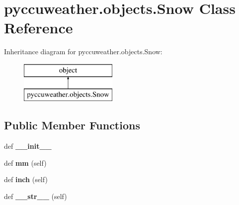 \hypertarget{classpyccuweather_1_1objects_1_1_snow}{}\section{pyccuweather.\+objects.\+Snow Class Reference}
\label{classpyccuweather_1_1objects_1_1_snow}
Inheritance diagram for pyccuweather.\+objects.\+Snow\+:\begin{figure}[H]
\begin{center}
\leavevmode
\includegraphics[height=2.000000cm]{classpyccuweather_1_1objects_1_1_snow}
\end{center}
\end{figure}
\subsection*{Public Member Functions}
\begin{DoxyCompactItemize}
\item 
\hypertarget{classpyccuweather_1_1objects_1_1_snow_ae0848ebe5fd948badf776a7dccb52fa6}{}def {\bfseries \+\_\+\+\_\+init\+\_\+\+\_\+}\label{classpyccuweather_1_1objects_1_1_snow_ae0848ebe5fd948badf776a7dccb52fa6}

\item 
\hypertarget{classpyccuweather_1_1objects_1_1_snow_a9d6ae3ea75aee9a8c5cd49e562159161}{}def {\bfseries mm} (self)\label{classpyccuweather_1_1objects_1_1_snow_a9d6ae3ea75aee9a8c5cd49e562159161}

\item 
\hypertarget{classpyccuweather_1_1objects_1_1_snow_af18371e5934d596bb02763b76e197b63}{}def {\bfseries inch} (self)\label{classpyccuweather_1_1objects_1_1_snow_af18371e5934d596bb02763b76e197b63}

\item 
\hypertarget{classpyccuweather_1_1objects_1_1_snow_a70d3f82377ec3fac366ee9bfc3418a33}{}def {\bfseries \+\_\+\+\_\+str\+\_\+\+\_\+} (self)\label{classpyccuweather_1_1objects_1_1_snow_a70d3f82377ec3fac366ee9bfc3418a33}

\end{DoxyCompactItemize}
